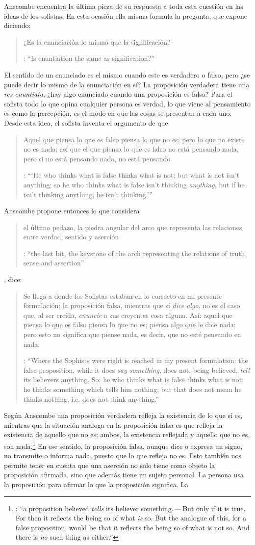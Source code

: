 Anscombe encuentra la última pieza de su respuesta a toda esta cuestión en las ideas de los sofistas. En esta ocasión ella misma formula la pregunta, que expone diciendo:  \blockquote[{\cite[271]{anscombe2015logic:tsa}}: \enquote{Is enuntiation the same as signification?}]{¿Es la enunciación lo mismo que la significación?}. El sentido de un enunciado es el mismo cuando este es verdadero o falso, pero ¿se puede decir lo mismo de la enunciación en sí? La proposición verdadera tiene una \emph{res enuntiata}, ¿hay algo enunciado cuando una proposición es falsa? Para el sofista todo lo que opina cualquier persona es verdad, lo que viene al pensamiento es como la percepción, es el modo en que las cosas se presentan a cada uno. Desde esta idea, el sofista inventa el argumento de que \blockquote[{\cite[264]{anscombe2015logic:tsa}}: \enquote{`He who thinks what is false thinks what is not; but what is not isn't anything; so he who thinks what is false isn't thinking \emph{anything}, but if he isn't thinking anything, he isn't thinking.'}]{Aquel que piensa lo que es falso piensa lo que no es; pero lo que no existe no es nada; así que el que piensa lo que es falso no está pensando nada, pero si no está pensando nada, no está pensando}. Anscombe propone entonces lo que considera \blockquote[{\cite[271]{anscombe2015logic:tsa}}: \enquote{the last bit, the keystone of the arch representing the relations of truth, sense and assertion}]{el último pedazo, la piedra angular del arco que representa las relaciones entre verdad, sentido y aserción}, dice: \blockquote[{\cite[271]{anscombe2015logic:tsa}}: \enquote{Where the Sophists were right is reached in my present formulation: the false proposition, while it does \emph{say something}, does not, being believed, \emph{tell} its believers anything. So: he who thinks what is false thinks what is not; he thinks something which tells him nothing; but that does not mean he thinks nothing, i.e. does not think anything.}]{Se llega a donde los Sofistas estaban en lo correcto en mi presente formulación: la proposición falsa, mientras que sí \emph{dice algo}, no es el caso que, al ser creída, \emph{enuncie} a sus creyentes cosa alguna. Así: aquel que piensa lo que es falso piensa lo que no es; piensa algo que le dice nada; pero esto no significa que piense nada, es decir, que no esté pensando en nada.} Según Anscombe una proposición verdadera refleja la existencia de lo que sí es, mientras que la situación analoga en la proposición falsa es que refleja la existencia de aquello que no es; ambos, la existencia reflejada y aquello que no es, son nada.\footnote{\cite[271]{anscombe2015logic:tsa}: \enquote{a proposition believed \emph{tells} its believer something.\,---\,But only if it is true. For then it reflects the being so of what \emph{is} so. But the analogue of this, for a false proposition, would be that it reflects the being so of what is not so. And there is \emph{no} such thing as either.}} En ese sentido, la proposición falsa, aunque dice o expresa un signo, no transmite o informa nada, puesto que lo que refleja no es. Esto también nos permite tener en cuenta que una aserción no solo tiene como objeto la proposición afirmada, sino que además tiene un sujeto personal. La persona usa la proposición para afirmar lo que la proposición significa. La 